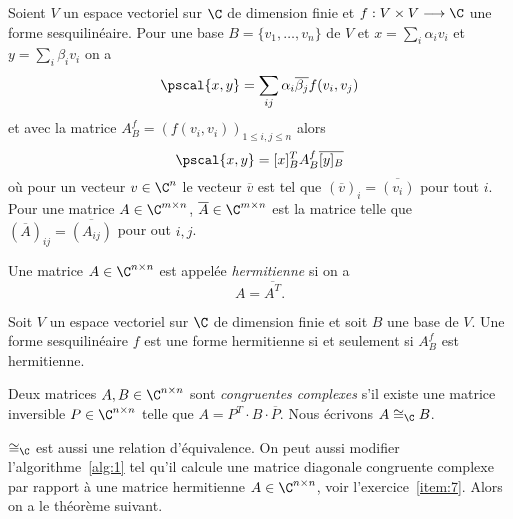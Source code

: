 Soient $V$ un espace vectoriel sur $\C$ de dimension finie et $f: V \times V \longrightarrow \C$ une forme sesquilinéaire. Pour une base  $B = \{v_1,\dots,v_n\}$ de $V$ et $x = \sum_i \alpha_i v_i$ et $y = \sum_i \beta_i v_i$ on a 
\begin{displaymath}
  \pscal{x,y} = \sum_{ij} \alpha_i\overline{\beta_j} f(v_i,v_j)
\end{displaymath}
et avec la matrice $A_B^f = (f(v_i,v_i))_{1 \leq i,j \leq n}$   alors 
\begin{equation}
  \label{eq:9}
  \pscal{x,y} = [x]_B ^T A_B^{f} \overline{[y]_B} 
\end{equation}
où pour un vecteur $v \in \C^n$ le vecteur $\overline{v}$ est tel que $(\overline{v})_i = \overline{(v_i)}$ pour tout $i$. Pour une matrice $A \in \C^{m \times n}$, $\overline{A} \in \C^{m \times n}$ est la matrice telle que 
$\left(\overline{A}\right)_{ij} = \overline{(A_{ij})}$ pour out $i,j$. 
\begin{definition}
  \label{def:17}
  Une matrice $A \in \C^{n \times n}$ est appelée \emph{hermitienne} si on a 
  \begin{displaymath}
    A = \overline{A^T}. 
  \end{displaymath}
\end{definition}


\begin{proposition}
  \label{prop:3}
  Soit  $V$  un espace vectoriel sur $\C$ de dimension finie et soit $B$  une base de $V$. Une forme sesquilinéaire $f$ est une forme hermitienne si et seulement si $A_B^f$ est hermitienne.  
\end{proposition}


\begin{definition}
  \label{def:18}
  Deux matrices $A,B \in \C^{n \times n}$ sont \emph{congruentes complexes} s'il existe une matrice inversible $P \in \C^{n \times n}$ telle que $A = {P^T} \cdot B \cdot \overline{P}$. Nous écrivons $A \cong_\C B$.  
\end{definition}
$\cong_\C$ est aussi une relation d'équivalence. On peut aussi modifier l'algorithme~\ref{alg:1} tel qu'il calcule une matrice diagonale congruente complexe par rapport à une matrice hermitienne $A \in \C^{n \times n}$,  voir l'exercice~\ref{item:7}. Alors on a le théorème suivant. 

